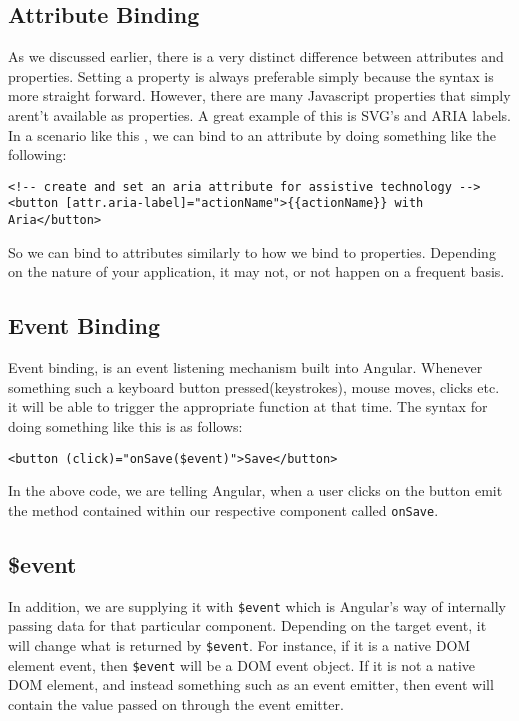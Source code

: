 \subsection{ Attribute Binding }
As we discussed earlier, there is a very distinct difference between 
attributes and properties. Setting a property is always preferable 
simply because the syntax is more straight forward. However, there are many 
Javascript properties that simply arent't available as properties. A great
example of this is SVG's and ARIA labels. In a scenario like this , we can bind 
to an attribute by doing something like the following: 
\begin{lstlisting}
<!-- create and set an aria attribute for assistive technology -->
<button [attr.aria-label]="actionName">{{actionName}} with Aria</button>  
\end{lstlisting}

So we can bind to attributes similarly to how we bind to properties. Depending
on the nature of your application, it may not, or not happen on a frequent 
basis.

\subsection{ Event Binding }
Event binding, is an event listening mechanism built into Angular. Whenever 
something such a keyboard button pressed(keystrokes), mouse moves, clicks etc. 
it will be able to trigger the appropriate function at that time. The syntax 
for doing something like this is as follows: 
\begin{lstlisting}
<button (click)="onSave($event)">Save</button> 
\end{lstlisting}

In the above code, we are telling Angular, when a user clicks on the button 
emit the method contained within our respective component called 
\lstinline{onSave}. 


\subsection{\$event}
In addition, we are supplying it with \lstinline{$event} which is Angular's way
of internally passing data for that particular component. Depending on the 
target event, it will change what is returned by \lstinline{$event}. For 
instance, if it is a native DOM element event, then \lstinline{$event} will be 
a DOM event object. If it is not a native DOM element, and instead something 
such as an event emitter, then event will contain the value passed on through 
the event emitter. 

